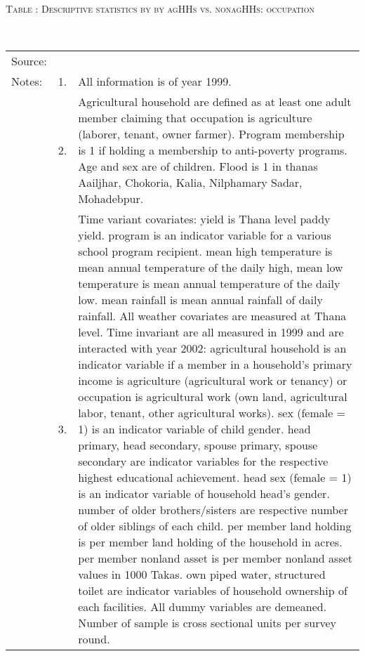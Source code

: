 \begin{minipage}[t]{14cm}
\hfil\textsc{\normalsize Table \thetable: Descriptive statistics by  by agHHs vs. nonagHHs: occupation\label{tab destat zEm1999 all by agHH occ}}\\
\setlength{\tabcolsep}{1pt}
\renewcommand{\arraystretch}{.8}
\hfil{}\\
\renewcommand{\arraystretch}{.8}
\setlength{\tabcolsep}{1pt}
\begin{tabular}{>{\hfill\scriptsize}p{1cm}<{}>{\hfill\scriptsize}p{.25cm}<{}>{\scriptsize}p{12cm}<{\hfill}}
Source:& \multicolumn{2}{l}{\scriptsize Compiled from IFPRI data.}\\
Notes: & 1. & All information is of year 1999.\\
& 2. & Agricultural household are defined as at least one adult member claiming that occupation is agriculture (laborer, tenant, owner farmer). \textsf{Program} membership is 1 if holding a membership to anti-poverty programs. \textsf{Age} and \textsf{sex} are of children. \textsf{Flood} is 1 in thanas Aailjhar,  Chokoria, Kalia, Nilphamary Sadar, Mohadebpur.\\
& 3. & Time variant covariates: \textsf{yield} is Thana level paddy yield. \textsf{program} is an indicator variable for a various school program recipient. \textsf{mean high temperature} is mean annual temperature of the daily high, \textsf{mean low temperature} is mean annual temperature of the daily low. \textsf{mean rainfall} is mean annual rainfall of daily rainfall. All weather covariates are measured at Thana level. Time invariant are all measured in 1999 and are interacted with year 2002: \textsf{agricultural household} is an indicator variable if a member in a household's primary income is agriculture (agricultural work or tenancy) or occupation is agricultural work (own land, agricultural labor, tenant, other agricultural works). \textsf{sex (female = 1)} is an indicator variable of child gender. \textsf{head primary, head secondary, spouse primary, spouse secondary} are indicator variables for the respective highest educational achievement. \textsf{head sex (female = 1)} is an indicator variable of household head's gender. \textsf{number of older brothers/sisters} are respective number of older siblings of each child. \textsf{per member land holding} is per member land holding of the household in acres. \textsf{per member nonland asset} is per member nonland asset values in 1000 Takas. \textsf{own piped water, structured toilet} are indicator variables of household ownership of each facilities. All dummy variables are demeaned. Number of sample is cross sectional units per survey round. 
\end{tabular}
\end{minipage}\\ \vspace{2ex}


